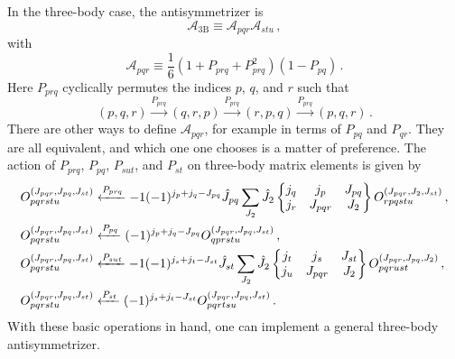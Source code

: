 In the three-body case,
the antisymmetrizer is
\begin{equation}\label{eq:threebody_antisymmetrizer}
  \mathcal{A}_{\text{3B}} \equiv \mathcal{A}_{pqr} \mathcal{A}_{stu}\,,
\end{equation}
with
\begin{equation}
  \mathcal{A}_{pqr} \equiv \frac{1}{6}(1 + P_{prq} + P_{prq}^2)(1 - P_{pq})\,.
\end{equation}
Here $P_{prq}$ cyclically permutes the indices $p$, $q$, and $r$ such that
\begin{equation}
  (p, q, r) \xrightarrow{P_{prq}} (q, r, p) \xrightarrow{P_{prq}} (r, p, q) \xrightarrow{P_{prq}} (p, q, r)\,.
\end{equation}
There are other ways to define $\mathcal{A}_{pqr}$,
for example in terms of $P_{pq}$ and $P_{qr}$.
They are all equivalent,
and which one one chooses is a matter of preference.
The action of $P_{prq}$, $P_{pq}$, $P_{sut}$, and $P_{st}$
on three-body matrix elements is given by
\begin{subequations}
  \begin{align}
    O_{pqrstu}^{(J_{pqr}, J_{pq}, J_{st})} &
    \xleftarrow{P_{prq}}
    -1 (-1)^{j_p + j_q - J_{pq}} \hat{J}_{pq}
    \sum_{J_{2}} \hat{J}_{2}
    \sixj{j_q}{j_p}{J_{pq}}{j_r}{J_{pqr}}{J_{2}}
    O_{rpqstu}^{(J_{pqr}, J_{2}, J_{st})}\,,  \\
    O_{pqrstu}^{(J_{pqr}, J_{pq}, J_{st})} &
    \xleftarrow{P_{pq}}
    (-1)^{j_p + j_q - J_{pq}}
    O_{qprstu}^{(J_{pqr}, J_{pq}, J_{st})}\,, \\
    O_{pqrstu}^{(J_{pqr}, J_{pq}, J_{st})} &
    \xleftarrow{P_{sut}}
    -1 (-1)^{j_s + j_t - J_{st}} \hat{J}_{st}
    \sum_{J_{2}} \hat{J}_{2}
    \sixj{j_t}{j_s}{J_{st}}{j_u}{J_{pqr}}{J_{2}}
    O_{pqrust}^{(J_{pqr}, J_{pq}, J_{2})}\,,  \\
    O_{pqrstu}^{(J_{pqr}, J_{pq}, J_{st})} &
    \xleftarrow{P_{st}}
    (-1)^{j_s + j_t - J_{st}}
    O_{pqrtsu}^{(J_{pqr}, J_{pq}, J_{st})}\,.
  \end{align}
\end{subequations}
With these basic operations in hand,
one can implement a general three-body antisymmetrizer.

